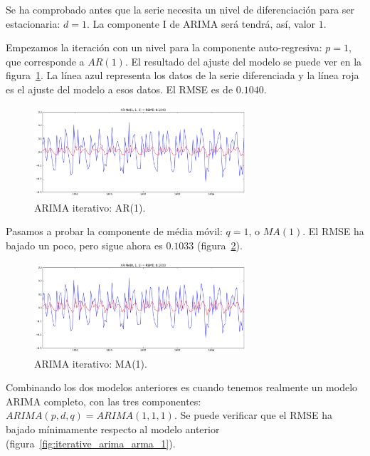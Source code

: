 \documentclass[11pt,spanish,listoffigures,listoftables]{tfgetsinf}
\begin{document}
    Se ha comprobado antes que la serie necesita un nivel de diferenciación para ser estacionaria: \(d=1\). La componente I de ARIMA será tendrá, así, valor \(1\). 
    
    Empezamos la iteración con un nivel para la componente auto-regresiva: \(p=1\), que corresponde a \(AR(1)\). El resultado del ajuste del modelo se puede ver en la figura~\ref{fig:iterative_arima_ar_1}. La línea azul representa los datos de la serie diferenciada y la línea roja es el ajuste del modelo a esos datos. El RMSE es de \(0.1040\). 
    
    \begin{figure}[h]
        \centering
        \includegraphics[width=0.7\textwidth]{arima_log_110.png}
        \caption{ARIMA iterativo: AR(1).}
        \label{fig:iterative_arima_ar_1}
    \end{figure}
    
    Pasamos a probar la componente de média móvil: \(q=1\), o \(MA(1)\). El RMSE ha bajado un poco, pero sigue ahora es \(0.1033\) (figura~\ref{fig:iterative_arima_ma_1}).
    
    \begin{figure}[h]
        \centering
        \includegraphics[width=0.7\textwidth]{arima_log_011.png}
        \caption{ARIMA iterativo: MA(1).}
        \label{fig:iterative_arima_ma_1}
    \end{figure}
    
    Combinando los dos modelos anteriores es cuando tenemos realmente un modelo ARIMA completo, con las tres componentes: \(ARIMA(p, d, q)=ARIMA(1, 1, 1)\). Se puede verificar que el RMSE ha bajado mínimamente respecto al modelo anterior (figura~\ref{fig:iterative_arima_arma_1}).
    
\end{document}
